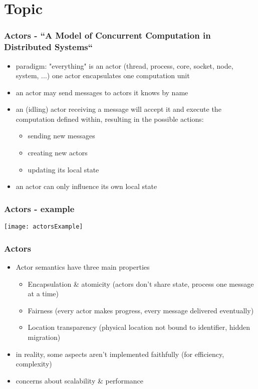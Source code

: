 \section{Topic}
\begin{frame}
\frametitle{Actors - ``A Model of Concurrent Computation in Distributed Systems``}
\begin{itemize}
\item paradigm: "everything" is an actor (thread, process, core, socket, node, system, ...) \textrightarrow{} one actor encapsulates one computation unit
\item an actor may send messages to actors it knows by name
\item an (idling) actor receiving a message will accept it and execute the computation defined within, resulting in the possible actions:
	\begin{itemize}
	\item sending new messages
	\item creating new actors
	\item updating its local state
	\end{itemize}
\item an actor can only influence its own local state
\end{itemize}
\end{frame}

\begin{frame}
\frametitle{Actors - example}
	\texttt{[image: actorsExample]}
\end{frame}

\begin{frame}
\frametitle{Actors}
\begin{itemize}
\item Actor semantics have three main properties
	\begin{itemize}
	\item Encapsulation \& atomicity
	(actors don't share state, process one message at a time)
	\item Fairness
	(every actor makes progress, every message delivered eventually)
	\item Location transparency
	(physical location not bound to identifier, hidden migration)
	\end{itemize}
\item in reality, some aspects aren't implemented faithfully (for efficiency, complexity)
\item concerns about scalability \& performance
\end{itemize}
\end{frame}

